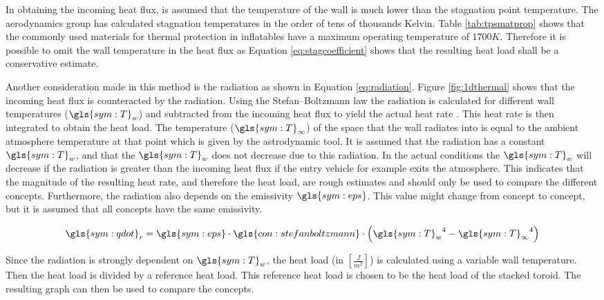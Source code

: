 In obtaining the incoming heat flux, is assumed that the temperature of the wall is much lower than the stagnation point temperature. The aerodynamics group has calculated stagnation temperatures in the order of tens of thousands Kelvin. Table \ref{tab:tpsmatprop} shows that the commonly used materials for thermal protection in inflatables have a maximum operating temperature of $1700K$. Therefore it is possible to omit the wall temperature in the heat flux as Equation \eqref{eq:stagcoefficient} shows that the resulting heat load shall be a conservative estimate. 

Another consideration made in this method is the radiation as shown in Equation \ref{eq:radiation}. Figure \ref{fig:1dthermal} shows that the incoming heat flux is counteracted by the radiation. Using the Stefan–Boltzmann law the radiation is calculated for different wall temperatures ($\gls{sym:T}_w$) and subtracted from the incoming heat flux to yield the actual heat rate \cite{Holman2002}. This heat rate is then integrated to obtain the heat load. The temperature ($\gls{sym:T}_\infty$) of the space that the wall radiates into is equal to the ambient atmosphere temperature at that point which is given by the astrodynamic tool. It is assumed that the radiation has a constant $\gls{sym:T}_w$, and that the $\gls{sym:T}_w$ does not decrease due to this radiation. In the actual conditions the $\gls{sym:T}_w$ will decrease if the radiation is greater than the incoming heat flux if the entry vehicle for example exits the atmosphere. This indicates that the magnitude of the resulting heat rate, and therefore the heat load, are rough estimates and should only be used to compare the different concepts. Furthermore, the radiation also depends on the emissivity $ \gls{sym:eps}$. This value might change from concept to concept, but it is assumed that all concepts have the same emissivity.

\begin{equation}
\label{eq:radiation}
\gls{sym:qdot}_r = \gls{sym:eps} \cdot \gls{con:stefanboltzmann} \cdot \left( {\gls{sym:T}_w}^4 - {\gls{sym:T}_\infty}^4  \right)
\end{equation}


Since the radiation is strongly dependent on $\gls{sym:T}_w$, the heat load (in $\left[\frac{J}{m^2}\right]$) is calculated using a variable wall temperature. Then the heat load is divided by a reference heat load. This reference heat load is chosen to be the heat load of the stacked toroid. The resulting graph can then be used to compare the concepts.

